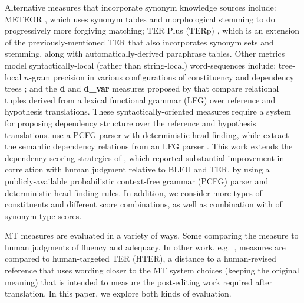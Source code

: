 \documentclass{kluwer}    %
\begin{document}
\begin{article}
Alternative measures that 
incorporate synonym knowledge sources include: METEOR
\cite{banerjee05meteor}, which uses synonym tables and
morphological stemming to do progressively more forgiving matching;
TER Plus (TERp) \cite{snover09terp}, which is an extension of the
previously-mentioned TER that also incorporates synonym sets and stemming, along
with automatically-derived paraphrase tables.  
%
Other metrics model syntactically-local (rather than string-local)
word-sequences include: tree-local
$n$-gram precision in various configurations of constituency and
dependency trees \cite{liu05syntaxformteval}; and the \textbf{d} and
\textbf{d\_var} measures proposed by  that compare relational tuples derived from a
lexical functional grammar (LFG)
over reference and hypothesis translations.
%
These syntactically-oriented measures require a system for proposing
dependency structure over the reference and hypothesis
translations.  use a
PCFG parser with deterministic head-finding, while 
\cite{owczarzak07evaluatingmt} extract the semantic dependency
relations from an LFG parser \cite{cahill04lfg}.
%
This work extends the dependency-scoring strategies of
, which reported substantial
improvement in correlation with human judgment relative to BLEU and
TER, by using a 
publicly-available probabilistic context-free grammar (PCFG) parser and deterministic head-finding rules. In addition, we consider more types of constituents and different score combinations, as well as combination with of synonym-type scores.
 
MT measures are evaluated in a variety of ways. Some
\cite{banerjee05meteor,liu05syntaxformteval,owczarzak07evaluatingmt}
comparing the measure to human
judgments of fluency and adequacy.  In other work, e.g.\
\cite{snover06ter}, measures are compared to
human-targeted TER (HTER), a distance to a human-revised reference
that uses wording closer to the MT system choices (keeping the
original meaning) that is intended to measure the post-editing work
required after translation.  In this paper, we explore both kinds of
evaluation.


\end{article}
\end{document}
